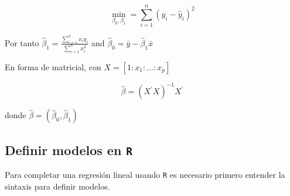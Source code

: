 \documentclass[]{article}
\numberwithin{equation}{section}
\begin{document}
\[
\min_{\beta_0,\beta_1} = \sum_{i=1}^{n} (y_i - \hat{y}_i)^2  
\]

Por tanto
\(\hat{\beta}_1 = \frac{\sum_{i=1}^{n}x_iy_i}{\sum_{i=1}^n x_i^2}\) and
\(\hat{\beta}_0 = \bar{y} - \hat{\beta}_1\bar{x}\)

En forma de matricial, con \(X=[1:x_1:...:x_p]\)

\[
\hat{\beta}  = (X^\prime X)^{-1} X^\prime
\]

donde \(\hat{\beta} = (\hat{\beta}_0,\hat{\beta}_1)\)

\subsection{\texorpdfstring{Definir modelos en
\texttt{R}}{Definir modelos en R}}\label{definir-modelos-en-r}

Para completar una regresión lineal usando \texttt{R} es necesario
primero entender la sintaxis para definir modelos.
\end{document}
